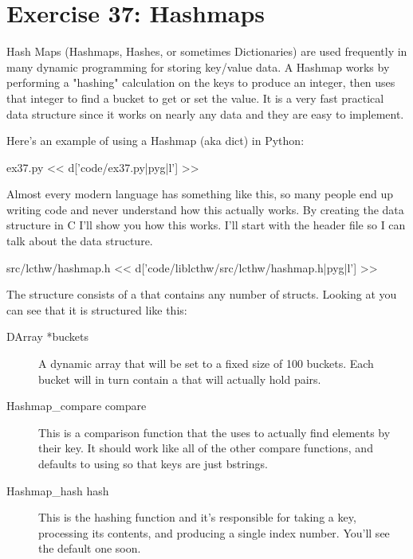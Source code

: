 \chapter{Exercise 37: Hashmaps}

Hash Maps (Hashmaps, Hashes, or sometimes Dictionaries) are used frequently in
many dynamic programming for storing key/value data.  A Hashmap works by performing
a "hashing" calculation on the keys to produce an integer, then uses that
integer to find a bucket to get or set the value.  It is a very fast practical
data structure since it works on nearly any data and they are easy to implement.

Here's an example of using a Hashmap (aka dict) in Python:

\begin{code}{ex37.py}
<< d['code/ex37.py|pyg|l'] >>
\end{code}

Almost every modern language has something like this, so many people
end up writing code and never understand how this actually works.
By creating the  data structure in C I'll show you how
this works.  I'll start with the header file so I can talk about the
data structure.

\begin{code}{src/lcthw/hashmap.h}
<< d['code/liblcthw/src/lcthw/hashmap.h|pyg|l'] >>
\end{code}

The structure consists of a  that contains
any number of  structs.  Looking at 
you can see that it is structured like this:

\begin{description}
\item[DArray *buckets] A dynamic array that will be set to a fixed size of
    100 buckets.  Each bucket will in turn contain a  that will
    actually hold  pairs.
\item[Hashmap\_compare compare] This is a comparison function that the
     uses to actually find elements by their key.  It should
    work like all of the other compare functions, and defaults to using
     so that keys are just bstrings.
\item[Hashmap\_hash hash] This is the hashing function and it's responsible
    for taking a key, processing its contents, and producing a single
     index number.  You'll see the default one soon.
\end{description}

